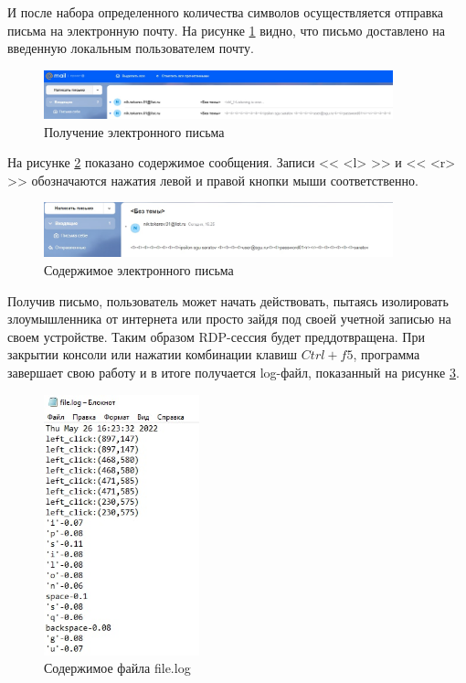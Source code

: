\documentclass[bachelor, och, coursework]{SCWorks}
\begin{document}
  И после набора определенного количества символов осуществляется отправка письма на электронную почту. На рисунке \ref{mailcheck} видно,
  что письмо доставлено на введенную локальным пользователем почту.

  \begin{figure}[H]
    \centering
    \includegraphics[width=0.9\textwidth]{photo/mail.png}
    \caption{Получение электронного письма}
    \label{mailcheck}
  \end{figure}

  На рисунке \ref{mail1} показано содержимое сообщения. Записи << <l> >> и << <r> >> обозначаются нажатия левой и правой кнопки мыши соответственно.

  \begin{figure}[H]
    \centering
    \includegraphics[width=0.9\textwidth]{photo/alsomail.png}
    \caption{Содержимое электронного письма}
    \label{mail1}
  \end{figure}

  Получив письмо, пользователь может начать действовать, пытаясь изолировать злоумышленника от интернета или просто зайдя под своей учетной записью на своем
  устройстве. Таким образом RDP-сессия будет преддотвращена. При закрытии консоли или нажатии комбинации клавиш $Ctrl + f5$, программа завершает 
  свою работу и в итоге получается log-файл, показанный на рисунке \ref{r1}. 
  
  
  \begin{figure}[H]
    \centering
    \includegraphics[width=0.4\textwidth]{photo/log-file.png}
    \caption{Содержимое файла file.log}
    \label{r1}
  \end{figure}
\end{document}
